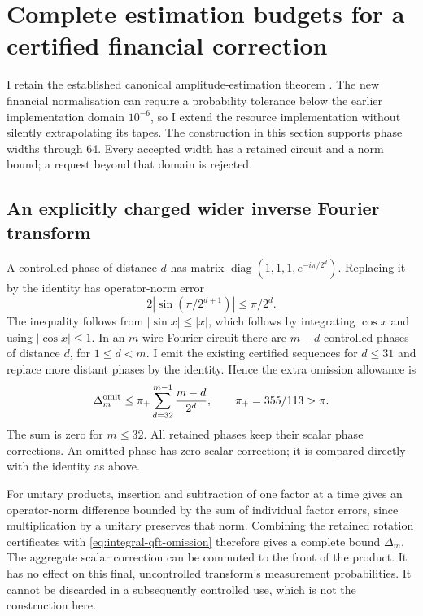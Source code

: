 \section{Complete estimation budgets for a certified financial correction}
\label{sec:integral-estimation-budget}

I retain the established canonical amplitude-estimation theorem
\citep{brassard}. The new financial normalisation can require a probability
tolerance below the earlier implementation domain $10^{-6}$, so I extend
the resource implementation without silently extrapolating its tapes.
The construction in this section supports phase widths through 64. Every
accepted width has a retained circuit and a norm bound; a request beyond
that domain is rejected.

\subsection{An explicitly charged wider inverse Fourier transform}

A controlled phase of distance $d$ has matrix
$\operatorname{diag}(1,1,1,e^{-i\pi/2^d})$. Replacing it by the identity
has operator-norm error
\[
 2|\sin(\pi/2^{d+1})|\leq\pi/2^d.
\]
The inequality follows from $|\sin x|\leq|x|$, which follows by integrating
$\cos x$ and using $|\cos x|\leq1$. In an $m$-wire Fourier circuit there
are $m-d$ controlled phases of distance $d$, for $1\leq d<m$.
I emit the existing certified sequences for $d\leq31$ and replace more
distant phases by the identity. Hence the extra omission allowance is
\begin{equation}
 \Delta_m^{\rm omit}\leq\pi_+
       \sum_{d=32}^{m-1}{m-d\over2^d},\qquad \pi_+=355/113>\pi.
 \label{eq:integral-qft-omission}
\end{equation}
The sum is zero for $m\leq32$. All retained phases keep their scalar phase
corrections. An omitted phase has zero scalar correction; it is compared
directly with the identity as above.

For unitary products, insertion and subtraction of one factor at a time
gives an operator-norm difference bounded by the sum of individual
factor errors, since multiplication by a unitary preserves that norm.
Combining the retained rotation certificates with
\eqref{eq:integral-qft-omission} therefore gives a complete bound
$\Delta_m$. The aggregate scalar correction can be commuted to the front
of the product. It has no effect on this final, uncontrolled transform's
measurement probabilities. It cannot be discarded in a subsequently
controlled use, which is not the construction here.

